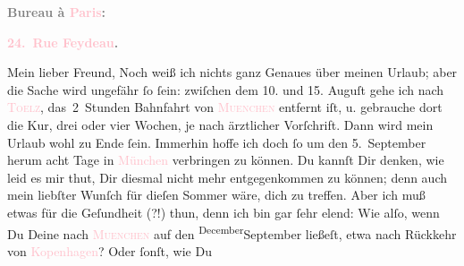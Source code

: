            \pstart
           \begin{otherlanguage}{french}\textcolor{gray}{\textbf{\textbf{Bureau à \textcolor{pink}{Paris}{}\ledrightnote{\textcolor{pink}{Paris}}:}}}\end{otherlanguage}\pend
           \pstart
           \begin{otherlanguage}{french}\textcolor{gray}{\textbf{\textbf{\textcolor{pink}{24. Rue Feydeau}{}\ledrightnote{\textcolor{pink}{rue Feydeau}}.}}}\end{otherlanguage}\pend
           \pstart\center{}Mein lieber Freund,\pend\pstart
           Noch weiß ich nichts ganz Genaues über meinen Urlaub; aber die Sache wird ungefähr ſo
               ſein: zwiſchen dem 10. und 15.
                  Auguſt gehe ich nach \textsc{\textcolor{pink}{Toelz}{}\ledrightnote{\textcolor{pink}{Bad Tölz}}}, das 2 Stunden Bahnfahrt von \textsc{\textcolor{pink}{Muenchen}{}\ledrightnote{\textcolor{pink}{München}}} entfernt iſt, u. gebrauche dort die Kur, drei oder vier Wochen, je nach
               ärztlicher Vorſchrift. {\pb}Dann wird mein Urlaub wohl
               zu Ende ſein. Immerhin hoffe ich doch ſo um den 5. September herum acht Tage in \textcolor{pink}{München}{}\ledrightnote{\textcolor{pink}{München}} verbringen zu können. Du kannſt Dir denken, wie leid es mir thut,
               Dir diesmal nicht mehr entgegenkommen zu können; denn auch mein liebſter Wunſch für
               dieſen Sommer wäre, dich zu treffen. Aber ich muß {\pb}etwas für die Geſundheit (?!) thun, denn ich bin gar ſehr elend: Wie alſo, wenn Du
               Deine \label{K_L02738-1v}\label{K_L02738-1h} nach \textcolor{pink}{\textsc{Muenchen}}{}\ledrightnote{\textcolor{pink}{München}} auf den \substVorne{}\textsuperscript{December}{\allowbreak}\substDazwischen{}September\substHinten{} ließeſt, etwa  nach Rückkehr \strikeout{\textcolor{gray}{v}} von \textcolor{pink}{Kopenhagen}{}\ledrightnote{\textcolor{pink}{Kopenhagen}}? Oder ſonſt, wie Du
